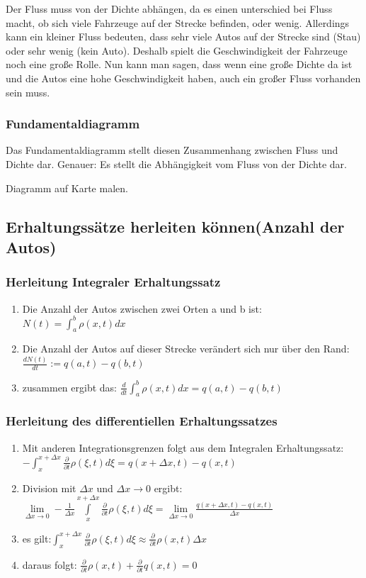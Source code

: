 \documentclass[]{article}
\begin{document}
Der Fluss muss von der Dichte abhängen, da es einen unterschied bei Fluss macht, ob sich viele Fahrzeuge auf der Strecke befinden, oder wenig. Allerdings kann ein kleiner Fluss bedeuten, dass sehr viele Autos auf der Strecke sind (Stau) oder sehr wenig (kein Auto). Deshalb spielt die Geschwindigkeit der Fahrzeuge noch eine große Rolle. Nun kann man sagen, dass wenn eine große Dichte da ist und die Autos eine hohe Geschwindigkeit haben, auch ein großer Fluss vorhanden sein muss. 

\subsubsection*{Fundamentaldiagramm}
Das Fundamentaldiagramm stellt diesen Zusammenhang zwischen Fluss und Dichte dar. Genauer: Es stellt die Abhängigkeit vom Fluss von der Dichte dar. 

Diagramm auf Karte malen. 

\subsection*{Erhaltungssätze herleiten können(Anzahl der Autos)}

\subsubsection*{Herleitung Integraler Erhaltungssatz}
\begin{enumerate}
	\item Die Anzahl der Autos zwischen zwei Orten a und b ist: $N(t) = \int_a^b \rho(x,t) dx$
	\item Die Anzahl der Autos auf dieser Strecke verändert sich nur über den Rand: $\frac{dN(t)}{dt} := q(a,t) - q(b,t)$
	\item zusammen ergibt das: $\frac{d}{dt} \int_a^b \rho(x,t) dx = q(a,t) - q(b,t)$
\end{enumerate}


\subsubsection*{Herleitung des differentiellen Erhaltungssatzes}
\begin{enumerate}
	\item Mit anderen Integrationsgrenzen folgt aus dem Integralen Erhaltungssatz: $- \int_x^{x+\Delta x} \frac{\partial }{\partial t}\rho (\xi, t) d \xi = q(x + \Delta x, t) - q(x,t)$
	\item Division mit $\Delta x$ und $\Delta x \rightarrow 0$ ergibt: $\lim\limits_{\Delta x \to 0} - \frac{1}{\Delta x} \int\limits_x^{x+\Delta x} \frac{\partial }{\partial t} \rho (\xi, t) d \xi = \lim\limits_{\Delta x \to 0} \frac{q(x + \Delta x, t) - q(x,t)}{\Delta x}$
	\item es gilt:$\int_x^{x+\Delta x} \frac{\partial }{\partial t} \rho (\xi, t) d \xi \approx \frac{\partial}{\partial t} \rho(x,t) \Delta x$ 
	\item daraus folgt: $\frac{\partial}{\partial t} \rho(x,t) + \frac{\partial}{\partial t} q(x,t) = 0$
\end{enumerate}
\end{document}
